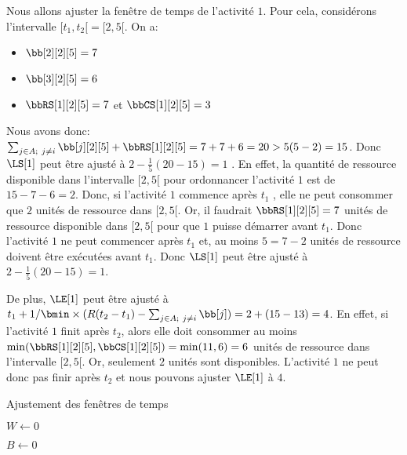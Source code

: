 \begin{ex}
  Nous allons ajuster la fenêtre de temps de l'activité $1$. Pour cela,
  considérons l'intervalle $[t_1,t_2[=[2,5[$. On a:
  \begin{itemize}
  \item $\bb[2][2][5]=7$
  \item $\bb[3][2][5]=6$
  \item $\bbRS[1][2][5]=7$ et $\bbCS[1][2][5]=3$
  \end{itemize}
  Nous avons donc: $\sum_{j\in A;\ j\neq i} \bb[j][2][5] +
  \bbRS[1][2][5]= 7+7+6 =20 > 5 (5-2) =15$. Donc $\LS[1]$ peut être ajusté
  à $ 2 -\frac{1}{5} (20-15) = 1$ .
  En effet, la quantité de ressource disponible dans l'intervalle
  $[2,5[$ pour ordonnancer l'activité $1$ est de $15-7-6=2$. Donc, si
  l'activité $1$ commence après $t_1$ , elle ne peut consommer que $2$
  unités de ressource dans $[2,5[$.  Or, il faudrait $\bbRS[1][2][5]= 7$
  unités de ressource disponible dans $[2,5[$ pour que $1$ puisse
  démarrer avant $t_1$. Donc l'activité $1$ ne peut commencer après $t_1$
  et, au moins $5= 7-2$ unités de ressource doivent être exécutées avant
  $t_1$. Donc $\LS[1]$ peut être ajusté à $2 - \frac{1}{5}(20-15) =1 $.

  De plus, $\LE[1]$ peut être ajusté à $t_1 + 1/ \bmin \times (R(t_2-t_1) -
  \sum_{j\in A;\ j\neq i} \bb[j] )= 2+(15-13)=4$. En effet, si l'activité
  $1$ finit après $t_2$, alors elle doit consommer au moins
  $\min(\bbRS[1][2][5],\bbCS[1][2][5])=\min(11,6)=6$ unités de ressource
  dans l'intervalle $[2,5[$. Or, seulement $2$ unités sont
  disponibles. L'activité $1$ ne peut donc pas finir après $t_2$ et nous
  pouvons ajuster $\LE[1]$ à $4$.
\end{ex}

\begin{algorithm}[!htb]
  \caption{Ajustement des fenêtres de temps}
  \label{algo1}
    \PourTous {intervalle d'intérêt $[t_1,t_2[$}
    { $W\gets 0$
    
      $B\gets 0$
}    
\end{algorithm}


